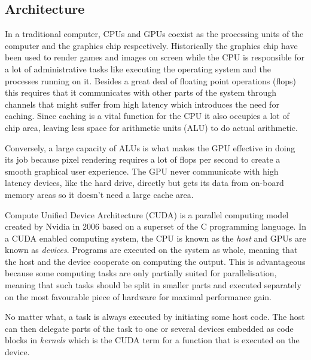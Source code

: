 
\subsection{Architecture}
In a traditional computer, CPUs and GPUs coexist as the processing units of the computer and the graphics chip respectively. Historically the graphics chip have been used to render games and images on screen while the CPU is responsible for a lot of administrative tasks like executing the operating system and the processes running on it. Besides a great deal of floating point operations (flops) this requires that it communicates with other parts of the system through channels that might suffer from high latency which introduces the need for caching. Since caching is a vital function for the CPU it also occupies a lot of chip area, leaving less space for arithmetic units (ALU) to do actual arithmetic. 

Conversely, a large capacity of ALUs is what makes the GPU effective in doing its job because pixel rendering requires a lot of flops per second to create a smooth graphical user experience. The GPU never communicate with high latency devices, like the hard drive, directly but gets its data from on-board memory areas so it doesn't need a large cache area.

Compute Unified Device Architecture (CUDA) is a parallel computing model created by Nvidia in 2006 based on a superset of the C programming language. In a CUDA enabled computing system, the CPU is known as the \emph{host} and GPUs are known as \emph{devices}. Programs are executed on the system as whole, meaning that the host and the device cooperate on computing the output. This is advantageous because some computing tasks are only partially suited for parallelisation, meaning that such tasks should be split in smaller parts and executed separately on the most favourable piece of hardware for maximal performance gain. 

No matter what, a task is always executed by initiating some host code. The host can then delegate parts of the task to one or several devices embedded as code blocks in \emph{kernels} which is the CUDA term for a function that is executed on the device.




